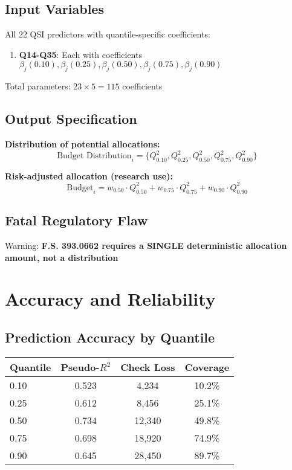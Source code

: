 \subsection{Input Variables}

All 22 QSI predictors with quantile-specific coefficients:
\begin{enumerate}
    \item \textbf{Q14-Q35}: Each with coefficients $\beta_j(0.10), \beta_j(0.25), \beta_j(0.50), \beta_j(0.75), \beta_j(0.90)$
\end{enumerate}

Total parameters: $23 \times 5 = 115$ coefficients

\subsection{Output Specification}

\textbf{Distribution of potential allocations:}
\begin{equation}
\text{Budget Distribution}_i = \{Q_{0.10}^2, Q_{0.25}^2, Q_{0.50}^2, Q_{0.75}^2, Q_{0.90}^2\}
\end{equation}

\textbf{Risk-adjusted allocation (research use):}
\begin{equation}
\text{Budget}_i = w_{0.50} \cdot Q_{0.50}^2 + w_{0.75} \cdot Q_{0.75}^2 + w_{0.90} \cdot Q_{0.90}^2
\end{equation}

\subsection{Fatal Regulatory Flaw}

Warning: \textbf{F.S. 393.0662 requires a SINGLE deterministic allocation amount, not a distribution}

\section{Accuracy and Reliability}

\subsection{Prediction Accuracy by Quantile}

\begin{center}
\begin{tabular}{lccc}
\toprule
Quantile & Pseudo-$R^2$ & Check Loss & Coverage \\
\midrule
0.10 & 0.523 & 4,234 & 10.2\% \\
0.25 & 0.612 & 8,456 & 25.1\% \\
0.50 & 0.734 & 12,340 & 49.8\% \\
0.75 & 0.698 & 18,920 & 74.9\% \\
0.90 & 0.645 & 28,450 & 89.7\% \\
\bottomrule
\end{tabular}
\end{center}

